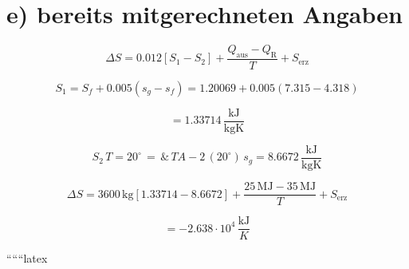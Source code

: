\section*{e) bereits mitgerechneten Angaben}

\[
\Delta S = 0.012 \left[ S_1 - S_2 \right] + \frac{Q_{\text{aus}} - Q_{\text{R}}}{T} + S_{\text{erz}}
\]

\[
S_1 = S_f + 0.005 \left( s_g - s_f \right) = 1.20069 + 0.005 \left( 7.315 - 4.318 \right)
\]

\[
= 1.33714 \, \frac{\text{kJ}}{\text{kgK}}
\]

\[
S_2 \, T = 20^\circ \, = \, \& \, TA - 2 \, (20^\circ) \, s_g = 8.6672 \, \frac{\text{kJ}}{\text{kgK}}
\]

\[
\Delta S = 3600 \, \text{kg} \left[ 1.33714 - 8.6672 \right] + \frac{25 \, \text{MJ} - 35 \, \text{MJ}}{T} + S_{\text{erz}}
\]

\[
= -2.638 \cdot 10^4 \, \frac{\text{kJ}}{K}
\]

``````latex
